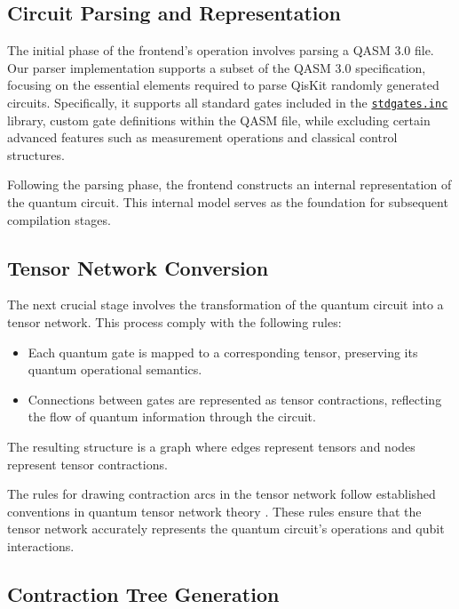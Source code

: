 \documentclass[12pt,oneside,a4paper]{article}
\begin{document}
\subsection{Circuit Parsing and Representation}

The initial phase of the frontend's operation involves parsing a QASM 3.0\cite{cross2017openquantumassemblylanguage} file. Our parser implementation supports a subset of the QASM 3.0 specification, focusing on the essential elements required to parse QisKit\cite{qiskit2024} randomly generated circuits. Specifically, it supports all standard gates included in the \href{https://github.com/Qiskit/qiskit/blob/main/qiskit/qasm/libs/stdgates.inc}{\texttt{stdgates.inc}} library, custom gate definitions within the QASM file, while excluding certain advanced features such as measurement operations and classical control structures.

Following the parsing phase, the frontend constructs an internal representation of the quantum circuit. This internal model serves as the foundation for subsequent compilation stages.

\subsection{Tensor Network Conversion}

The next crucial stage involves the transformation of the quantum circuit into a tensor network. This process comply with the following rules:

\begin{itemize}
    \item Each quantum gate is mapped to a corresponding tensor, preserving its quantum operational semantics.
    \item Connections between gates are represented as tensor contractions, reflecting the flow of quantum information through the circuit.
\end{itemize}

The resulting structure is a graph where edges represent tensors and nodes represent tensor contractions.

The rules for drawing contraction arcs in the tensor network follow established conventions in quantum tensor network theory \cite{biamonte2017tensornetworksnutshell}. These rules ensure that the tensor network accurately represents the quantum circuit's operations and qubit interactions.

\subsection{Contraction Tree Generation}
\end{document}
